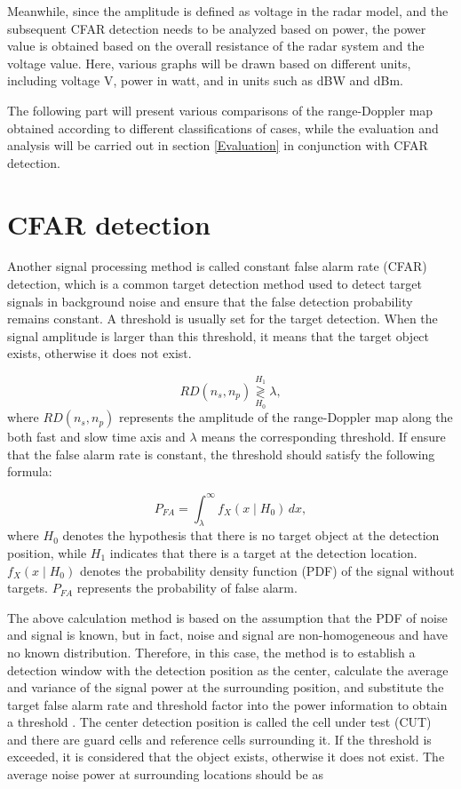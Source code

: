 \documentclass[12pt,DIV14,BCOR12mm,a4paper,footinclude=false,headinclude,parskip=half-,twoside,openright,cleardoublepage=empty,toc=index,bibliography=totoc,listof=totoc]{scrreprt}
\numberwithin{equation}{chapter}
\begin{document}
Meanwhile, since the amplitude is defined as voltage in the radar model, and the subsequent CFAR detection needs to be analyzed based on power, the power value is obtained based on the overall resistance of the radar system and the voltage value. Here, various graphs will be drawn based on different units, including voltage V, power in watt, and in units such as dBW and dBm.

The following part will present various comparisons of the range-Doppler map obtained according to different classifications of cases, while the evaluation and analysis will be carried out in section \ref{Evaluation} in conjunction with CFAR detection.

\section{CFAR detection} \label{CFAR detection}

Another signal processing method is called constant false alarm rate (CFAR) detection, which is a common target detection method used to detect target signals in background noise and ensure that the false detection probability remains constant. A threshold is usually set for the target detection. When the signal amplitude is larger than this threshold, it means that the target object exists, otherwise it does not exist.

\begin{equation}
    RD(n_s, n_p) \underset{H_0}{\overset{H_1}{\gtrless}} \lambda,
\end{equation}
where $RD(n_s, n_p)$ represents the amplitude of the range-Doppler map along the both fast and slow time axis and $\lambda$ means the corresponding threshold. If ensure that the false alarm rate is constant, the threshold should satisfy the following formula:

\begin{equation}
P_{FA} = \int_{\lambda}^{\infty} f_X(x \mid H_0) \, dx,
\end{equation}
where $H_0$ denotes the hypothesis that there is no target object at the detection position, while $H_1$ indicates that there is a target at the detection location. $f_X(x\mid H_0)$ denotes the probability density function (PDF) of the signal without targets. $P_{FA}$ represents the probability of false alarm.

The above calculation method is based on the assumption that the PDF of noise and signal is known, but in fact, noise and signal are non-homogeneous and have no known distribution. Therefore, in this case, the method is to establish a detection window with the detection position as the center, calculate the average and variance of the signal power at the surrounding position, and substitute the target false alarm rate and threshold factor into the power information to obtain a threshold \cite{cfar}. The center detection position is called the cell under test (CUT) and there are guard cells and reference cells surrounding it. If the threshold is exceeded, it is considered that the object exists, otherwise it does not exist. The average noise power at surrounding locations \cite{cfar_calculation} should be as
\end{document}
